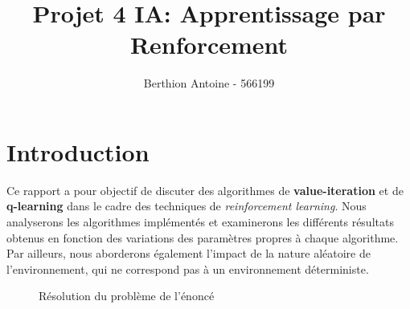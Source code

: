 \documentclass{article}
\title{Projet 4 IA: Apprentissage par Renforcement}
\author{Berthion Antoine - 566199}
\begin{document}
\maketitle

\section{Introduction}
\label{sec:introduction}

\noindent Ce rapport a pour objectif de discuter des algorithmes de \textbf{value-iteration} et de \textbf{q-learning} dans le cadre des techniques de \textit{reinforcement learning}. Nous analyserons les algorithmes implémentés et examinerons les différents résultats obtenus en fonction des variations des paramètres propres à chaque algorithme. Par ailleurs, nous aborderons également l’impact de la nature aléatoire de l’environnement, qui ne correspond pas à un environnement déterministe.

\vspace{-2em} %

\begin{figure}[h]
    \centering
    \hfill
    \caption{Résolution du problème de l'énoncé}
    \label{fig:intro}
\end{figure}

\vspace{-1em} %
\end{document}

